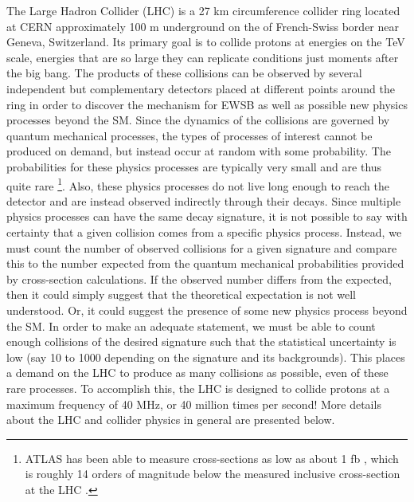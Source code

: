 



The Large Hadron Collider (LHC) \cite{lhc} is
a 27 km circumference collider ring
located at CERN approximately 100 m underground on the 
of French-Swiss border near Geneva, Switzerland.
Its primary goal is to collide protons at energies on the TeV scale, 
energies that are so large they can replicate conditions just moments
after the big bang.
The products of these collisions can 
be observed
by several independent but complementary detectors placed at different
points around the ring in order to discover the mechanism
for EWSB as well as possible new physics processes beyond the SM.
Since the dynamics of the collisions are governed by quantum mechanical
processes, the types of processes of interest cannot be
produced on demand, but instead occur at random with some
probability.
The probabilities for these physics processes are 
typically very small and are thus quite
rare \footnote{ATLAS has been able to measure cross-sections as 
low as about 1 fb \cite{PhysRevLett.113.141803}, which is roughly
14 orders of magnitude below the measured inclusive cross-section
at the LHC \cite{Aad:2014dca}.}.
Also, these physics processes do not live long
enough to reach the detector and are instead observed indirectly through their
decays. Since multiple physics processes can have the same decay 
signature, it is not possible to say with certainty that a given 
collision comes from a specific physics process. Instead, 
we must count the number of observed collisions for a given signature
and compare this to the number expected from the 
quantum mechanical probabilities provided by cross-section
calculations.  If the observed number differs
from the expected, then it could simply suggest that the theoretical expectation
is not well understood.  Or, it could suggest the presence of some new physics
process beyond the SM.
In order to make an adequate statement, we must be able to count
enough collisions of the desired signature 
such that the statistical uncertainty is low
(say 10 to 1000 depending on the signature and its backgrounds).  
This places a demand
on the LHC to produce as many collisions as possible, even of these rare
processes. To accomplish this, the LHC is designed to collide
protons at a maximum frequency of 40 MHz, or 40 million times per second!
More details about the LHC and collider physics in general are presented
below.



